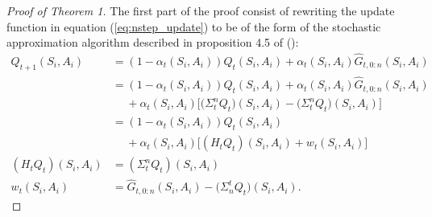 \begin{proof}[Proof of Theorem 1]
The first part of the proof consist of rewriting the update function in equation (\ref{eq:nstep_update}) to be of the form of the stochastic approximation algorithm described in proposition 4.5 of \citeauthor{Bertsekas:1996:NP:560669} (\citeyear{Bertsekas:1996:NP:560669}):
%
\begin{align}
Q_{t+1} (S_i, A_i) &= (1 - \alpha_t(S_i, A_i)) Q_t (S_i, A_i) + \alpha_t(S_i, A_i) 
	\hat{G}_{t, 0:n}(S_i, A_i) 
    \nonumber \\
& = (1 - \alpha_t(S_i, A_i)) Q_t (S_i, A_i) + \alpha_t(S_i, A_i) 
	\hat{G}_{t, 0:n}(S_i, A_i) 
    \nonumber \\
& \hspace{15pt} + \alpha_t(S_i, A_i) \Big[ \big( \Sigma^n_t Q_t \big) (S_i, A_i) 
	- \big( \Sigma^n_t Q_t \big) (S_i, A_i) \Big]
	\nonumber \\
& = (1 - \alpha_t (S_i, A_i)) Q_t (S_i, A_i) 
	\nonumber \\
& \hspace{15pt}
    + \alpha_t(S_i,A_i) \big[ (H_t Q_t) (S_i, A_i) 
	+ w_t (S_i, A_i) \big] 
	\nonumber \\
(H_t Q_t) (S_i, A_i) &= (\Sigma^n_t Q_t)(S_i, A_i)
    \nonumber \\
w_t (S_i, A_i) &= \hat{G}_{t, 0:n}(S_i, A_i) - \big( \Sigma^t_n Q_t \big) (S_i, A_i).
	\nonumber
\end{align} 


\end{proof}

